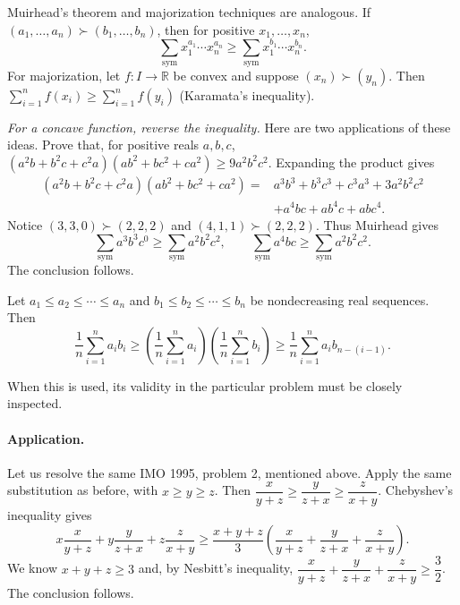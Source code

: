 \documentclass[11pt,a4paper]{article}
\begin{document}
\setcounter{theorem}{25}\begin{lemma}\label{lemma:muirhead-majorization}
Muirhead's theorem and majorization techniques are analogous.
If $(a_1,\ldots,a_n)\succ(b_1,\ldots,b_n)$, then for positive $x_1,\ldots,x_n$,
\[
\sum_{\mathrm{sym}}x_1^{a_1}\cdots x_n^{a_n}
\geq\sum_{\mathrm{sym}}x_1^{b_1}\cdots x_n^{b_n}.
\]
For majorization, let $f:I\to\mathbb R$ be convex and suppose $(x_n)\succ(y_n)$.
Then $\sum_{i=1}^n f(x_i)\geq\sum_{i=1}^n f(y_i)$ (Karamata's inequality).
\end{lemma}
\emph{For a concave function, reverse the inequality.}
Here are two applications of these ideas.
Prove that, for positive reals $a,b,c$,
$(a^2b+b^2c+c^2a)(ab^2+bc^2+ca^2)\geq9a^2b^2c^2$.
Expanding the product gives
\begin{align*}
(a^2b+b^2c+c^2a)(ab^2+bc^2+ca^2)
={}&a^3b^3+b^3c^3+c^3a^3+3a^2b^2c^2\\
&+a^4bc+ab^4c+abc^4.
\end{align*}
Notice $(3,3,0)\succ(2,2,2)$ and $(4,1,1)\succ(2,2,2)$.
Thus Muirhead gives
\[
\sum_{\mathrm{sym}}a^3b^3c^0\geq\sum_{\mathrm{sym}}a^2b^2c^2,
\qquad \sum_{\mathrm{sym}}a^4bc\geq\sum_{\mathrm{sym}}a^2b^2c^2.
\]
The conclusion follows.

\setcounter{theorem}{26}\begin{lemma}
Let $a_1\leq a_2\leq\cdots\leq a_n$ and $b_1\leq b_2\leq\cdots\leq b_n$ be nondecreasing real sequences. Then
\[
\frac1n\sum_{i=1}^n a_ib_i
\geq\left(\frac1n\sum_{i=1}^n a_i\right)
\left(\frac1n\sum_{i=1}^n b_i\right)
\geq\frac1n\sum_{i=1}^n a_ib_{n-(i-1)}.
\]
\end{lemma}
When this is used, its validity in the particular problem must be closely inspected.
\paragraph{Application.}
Let us resolve the same IMO 1995, problem 2, mentioned above.
Apply the same substitution as before, with $x\geq y\geq z$. Then
$\dfrac{x}{y+z}\geq\dfrac{y}{z+x}\geq\dfrac{z}{x+y}$.
Chebyshev's inequality gives
\[
x\frac{x}{y+z}+y\frac{y}{z+x}+z\frac{z}{x+y}
\geq\frac{x+y+z}{3}\left(\frac{x}{y+z}+\frac{y}{z+x}+\frac{z}{x+y}\right).
\]
We know $x+y+z\geq3$ and, by Nesbitt's inequality,
$\dfrac{x}{y+z}+\dfrac{y}{z+x}+\dfrac{z}{x+y}\geq\dfrac32$.
The conclusion follows.
\end{document}

